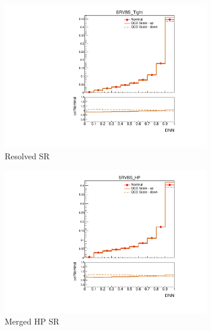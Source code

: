 \begin{figure}[ht]
    \centering
    \begin{subfigure}[b]{0.3\textwidth}
        \includegraphics[width=\textwidth]{figures/1lep/PDFUnc/QCDScale_DNN/EW6lvqq_0ptag2pjet_0ptv_SRVBS_Tight_DNN_SysTheoryQCD_VBS__1up_Norm.pdf}
        \caption{Resolved SR}
    \end{subfigure}
    \begin{subfigure}[b]{0.3\textwidth}
        \includegraphics[width=\textwidth]{figures/1lep/PDFUnc/QCDScale_DNN/EW6lvqq_0ptag1pfat0pjet_0ptv_SRVBS_HP_DNN_SysTheoryQCD_VBS__1up_Norm.pdf}
        \caption{Merged HP SR}
    \end{subfigure}
    \begin{subfigure}[b]{0.3\textwidth}

\end{subfigure}
\end{figure}
